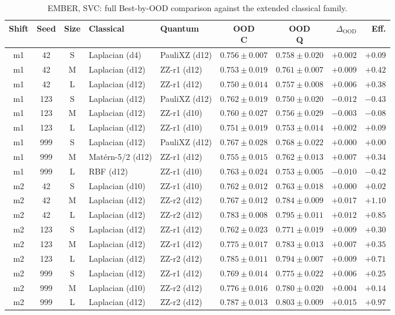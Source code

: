 \documentclass[journal]{IEEEtran}
\begin{document}
\begin{table}[!t]
\centering
\caption{EMBER, SVC: full Best-by-OOD comparison against the extended classical family.}
\label{app:ember_svc}
\scriptsize
\setlength{\tabcolsep}{2pt}
\begin{tabular}{@{}ccc ll cc rr@{}}
\toprule
Shift & Seed & Size & Classical & Quantum & \shortstack{OOD\\C} & \shortstack{OOD\\Q} & $\Delta_{\mathrm{OOD}}$ & Eff. \\
\midrule
m1 & 42 & S & Laplacian (d4) & PauliXZ (d12) & $0.756\pm0.007$ & $0.758\pm0.020$ & $+0.002$ & $+0.09$ \\
m1 & 42 & M & Laplacian (d12) & ZZ-r1 (d12) & $0.753\pm0.019$ & $0.761\pm0.007$ & $+0.009$ & $+0.42$ \\
m1 & 42 & L & Laplacian (d12) & ZZ-r1 (d12) & $0.750\pm0.014$ & $0.757\pm0.008$ & $+0.006$ & $+0.38$ \\
m1 & 123 & S & Laplacian (d12) & PauliXZ (d12) & $0.762\pm0.019$ & $0.750\pm0.020$ & $-0.012$ & $-0.43$ \\
m1 & 123 & M & Laplacian (d12) & ZZ-r1 (d10) & $0.760\pm0.027$ & $0.756\pm0.029$ & $-0.003$ & $-0.08$ \\
m1 & 123 & L & Laplacian (d12) & ZZ-r1 (d10) & $0.751\pm0.019$ & $0.753\pm0.014$ & $+0.002$ & $+0.09$ \\
m1 & 999 & S & Laplacian (d12) & PauliXZ (d12) & $0.767\pm0.028$ & $0.768\pm0.022$ & $+0.000$ & $+0.00$ \\
m1 & 999 & M & Mat\'ern-5/2 (d12) & ZZ-r1 (d12) & $0.755\pm0.015$ & $0.762\pm0.013$ & $+0.007$ & $+0.34$ \\
m1 & 999 & L & RBF (d12) & ZZ-r1 (d10) & $0.763\pm0.024$ & $0.753\pm0.005$ & $-0.010$ & $-0.42$ \\
m2 & 42 & S & Laplacian (d10) & ZZ-r1 (d10) & $0.762\pm0.012$ & $0.763\pm0.018$ & $+0.000$ & $+0.02$ \\
m2 & 42 & M & Laplacian (d12) & ZZ-r2 (d12) & $0.767\pm0.012$ & $0.784\pm0.009$ & $+0.017$ & $+1.10$ \\
m2 & 42 & L & Laplacian (d12) & ZZ-r2 (d12) & $0.783\pm0.008$ & $0.795\pm0.011$ & $+0.012$ & $+0.85$ \\
m2 & 123 & S & Laplacian (d12) & ZZ-r1 (d12) & $0.762\pm0.023$ & $0.771\pm0.019$ & $+0.009$ & $+0.30$ \\
m2 & 123 & M & Laplacian (d12) & ZZ-r1 (d12) & $0.775\pm0.017$ & $0.783\pm0.013$ & $+0.007$ & $+0.35$ \\
m2 & 123 & L & Laplacian (d12) & ZZ-r2 (d12) & $0.785\pm0.011$ & $0.794\pm0.007$ & $+0.009$ & $+0.71$ \\
m2 & 999 & S & Laplacian (d12) & ZZ-r1 (d12) & $0.769\pm0.014$ & $0.775\pm0.022$ & $+0.006$ & $+0.25$ \\
m2 & 999 & M & Laplacian (d10) & ZZ-r2 (d12) & $0.776\pm0.016$ & $0.780\pm0.020$ & $+0.004$ & $+0.14$ \\
m2 & 999 & L & Laplacian (d12) & ZZ-r2 (d12) & $0.787\pm0.013$ & $0.803\pm0.009$ & $+0.015$ & $+0.97$ \\\bottomrule
\end{tabular}
\end{table}
\end{document}
